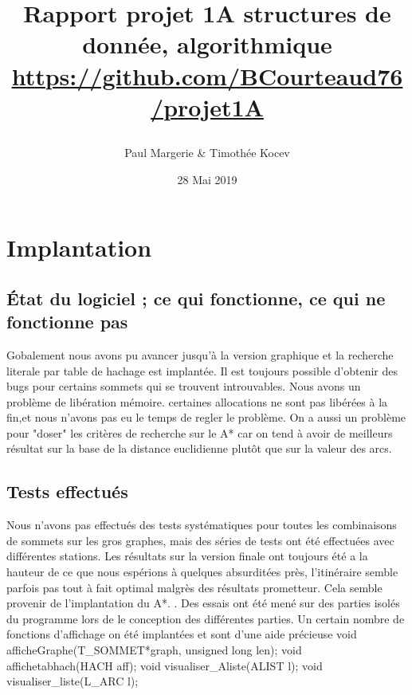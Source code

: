 \documentclass[12pt]{report}
\title{%
    \begin{minipage}\linewidth
        \centering
        Rapport projet 1A
        \vskip3pt
        \large structures de donnée, algorithmique
        \vskip5pt
        \large \url{https://github.com/BCourteaud76/projet1A}
    \end{minipage}
}
\author{Paul Margerie \& Timothée Kocev}
\date{28 Mai 2019}
\begin{document}
\maketitle
\renewcommand{\contentsname}{Sommaire} %
\renewcommand{\chaptername}{Chapitre} %
\tableofcontents

\chapter{Implantation}


\section{État du logiciel ; ce qui fonctionne, ce qui ne fonctionne pas}
Gobalement nous avons pu avancer jusqu'à la version graphique et la recherche literale par table de hachage est implantée. Il est toujours possible d'obtenir des bugs pour certains sommets qui se trouvent introuvables. \newline Nous avons un problème de libération mémoire. certaines allocations ne sont pas libérées à la fin,et nous n'avons pas eu le temps de regler le problème.
On a aussi un problème pour "doser" les critères de recherche sur le A* car on tend à avoir de meilleurs résultat sur la base de la distance euclidienne plutôt que sur la valeur des arcs.

\section{Tests effectués}
Nous n'avons pas effectués des tests systématiques pour toutes les combinaisons de sommets sur les gros graphes, mais des séries de tests ont été effectuées avec différentes stations. Les résultats sur la version finale ont toujours été a la hauteur de ce que nous espérions à quelques absurditées près, l'itinéraire semble parfois pas tout à fait optimal malgrès des résultats prometteur. Cela semble provenir de l'implantation du A*. 
. \newline Des essais ont été mené sur des parties isolés du programme lors de le conception des différentes parties.
\newline
\newline Un certain nombre de fonctions d'affichage on été implantées et sont d'une aide précieuse
\newline void afficheGraphe(T\_SOMMET*graph, unsigned long len);
\newline void affichetabhach(HACH aff);
\newline void visualiser\_Aliste(ALIST l);
\newline void visualiser\_liste(L\_ARC l);
\end{document}
